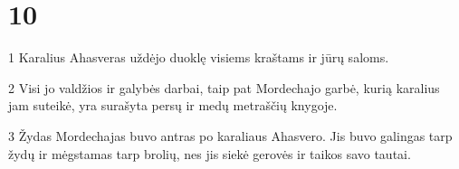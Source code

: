 \chapter{10}


\par 1 Karalius Ahasveras uždėjo duoklę visiems kraštams ir jūrų saloms. 
\par 2 Visi jo valdžios ir galybės darbai, taip pat Mordechajo garbė, kurią karalius jam suteikė, yra surašyta persų ir medų metraščių knygoje. 
\par 3 Žydas Mordechajas buvo antras po karaliaus Ahasvero. Jis buvo galingas tarp žydų ir mėgstamas tarp brolių, nes jis siekė gerovės ir taikos savo tautai.




